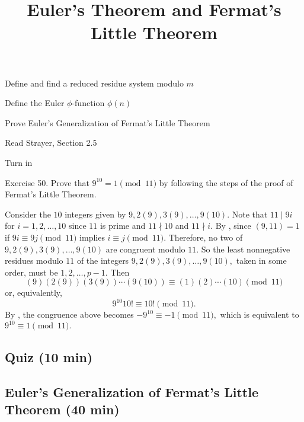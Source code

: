 \documentclass{../ximera}
\title{Euler's Theorem and Fermat's Little Theorem}
\begin{document}
\begin{abstract}
\end{abstract}
\maketitle

\begin{obj}
	\item Define and find a reduced residue system modulo $m$
	\item Define the Euler $\phi$-function $\phi(n)$
	\item Prove Euler's Generalization of Fermat's Little Theorem
\end{obj}

\begin{pre} \item[Read] Strayer, Section 2.5

    \item[Turn in]  
    
    Exercise 50. Prove that $9^{10} = 1\pmod{11}$ by following the steps of the proof of Fermat's Little Theorem.
    
    \begin{solution}
        Consider the $10$ integers given by $9,2(9), 3(9),\dots, 9(10).$ Note that $11\mid 9i$ for $i=1,2,\dots,10$ since $11$ is prime and $11\nmid 10$ and $11\nmid i.$ By , since $(9,11)=1$ if $9i\equiv 9j\pmod{11}$ implies $i\equiv j\pmod{11}.$ Therefore, no two of $9,2(9), 3(9),\dots, 9(10)$ are congruent modulo $11.$ So the least nonnegative residues modulo $11$ of the integers $9,2(9), 3(9),\dots, 9(10),$ taken in some order, must be $1,2,\dots, p-1.$ Then \[(9)(2(9)) (3(9))\cdots (9(10))\equiv (1)(2)\cdots (10)\pmod{11}\] or, equivalently, \[9^{10}10!\equiv 10!\pmod{11}.\] By , the congruence above becomes $-9^{10}\equiv -1\pmod{11},$ which is equivalent to $9^{10}\equiv 1\pmod{11}.$
    \end{solution}
\end{pre}
\subsection{Quiz (10 min)}

\subsection{Euler's Generalization of Fermat's Little Theorem (40 min)}
\end{document}
